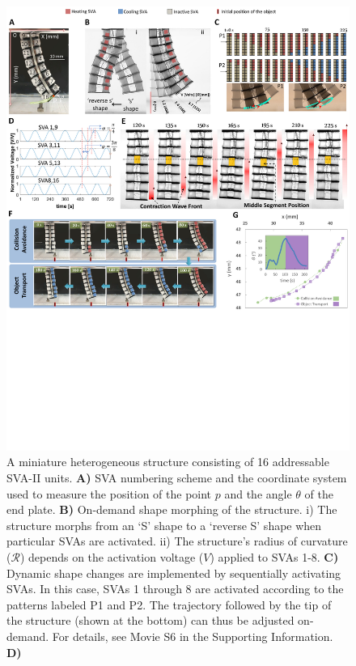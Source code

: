 \begin{figure}[t]
\centering
\includegraphics[width=\textwidth]{fig4.pdf}
\caption[A miniature soft robot consisting of 16 addressable SVA-II units]{A miniature heterogeneous structure consisting of 16 addressable SVA-II units. \textbf{A)} SVA numbering scheme and the coordinate system used to measure the position of the point $p$ and the angle $\theta$ of the end plate. \textbf{B)} On-demand shape morphing of the structure. i) The structure morphs from an `S' shape to a `reverse S' shape when particular SVAs are activated. 
ii) The structure's radius of curvature ($\mathcal{R}$) depends on the activation voltage ($V$) applied to SVAs 1-8. \textbf{C)} Dynamic shape changes are implemented by sequentially activating SVAs. In this case, SVAs 1 through 8 are activated according to the patterns labeled P1 and P2. The trajectory followed by the tip of the structure (shown at the bottom) can thus be adjusted on-demand. For details, see Movie S6 in the Supporting Information. \textbf{D)} 
}
\end{figure}
